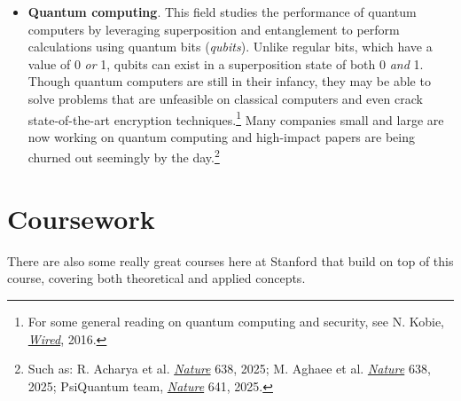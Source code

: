 \begin{itemize}
	\item \textbf{Quantum computing}. 
	This field studies the performance of quantum computers by leveraging superposition and entanglement to perform calculations using quantum bits (\emph{qubits}). 
	Unlike regular bits, which have a value of 0 \emph{or} 1, qubits can exist in a superposition state of both 0 \emph{and} 1. 
	Though quantum computers are still in their infancy, they may be able to solve problems that are unfeasible on classical computers and even crack state-of-the-art encryption techniques.\footnote{For some general reading on quantum computing and security, see N. Kobie, \href{http://www.wired.co.uk/article/quantum-computers-quantum-security-encryption}{\emph{Wired}}, 2016.}
	Many companies small and large are now working on quantum computing and high-impact papers are being churned out seemingly by the day.\footnote{Such as: R. Acharya et al. \href{https://www.nature.com/articles/s41586-024-08449-y}{\emph{Nature}} 638, 2025; M. Aghaee et al. \href{https://www.nature.com/articles/s41586-024-08445-2}{\emph{Nature}} 638, 2025; PsiQuantum team, \href{https://www.nature.com/articles/s41586-025-08820-7}{\emph{Nature}} 641, 2025.}
\end{itemize}


\section{Coursework}

There are also some really great courses here at Stanford that build on top of this course, covering both theoretical and applied concepts.

